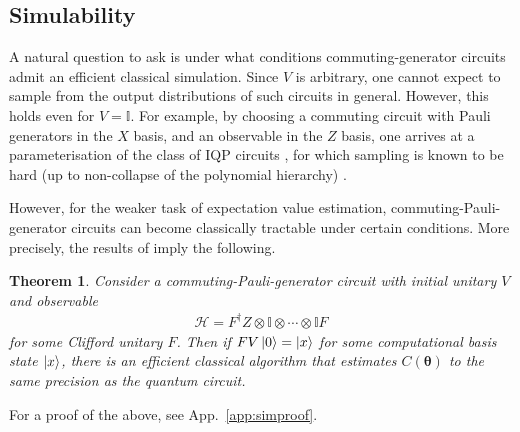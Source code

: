 \documentclass[a4paper,twocolumn,11pt]{quantumarticle}
\newtheorem{theorem}{Theorem}
\renewcommand{\vec}{\boldsymbol}
\begin{document}
\subsection{Simulability}\label{sec:simulate}
A natural question to ask is under what conditions commuting-generator circuits admit an efficient classical simulation. Since $V$ is arbitrary, one cannot expect to sample from the output distributions of such circuits in general. However, this holds even for $V=\mathbb{I}$. For example, by choosing a commuting circuit with Pauli generators in the $X$ basis, and an observable in the $Z$ basis, one arrives at a parameterisation of the class of IQP circuits \cite{bremner2016average,ni2012commuting}, for which sampling is known to be hard (up to non-collapse of the polynomial hierarchy) \cite{bremner2016average}. 

However, for the weaker task of expectation value estimation, commuting-Pauli-generator circuits can become classically tractable under certain conditions. More precisely, the results of \cite{ni2012commuting} imply the following. 

%
\begin{theorem}\label{thm:sim}
    Consider a commuting-Pauli-generator circuit with initial unitary $V$ and observable
    \begin{align}
        \mathcal{H}=F^\dagger Z \otimes \mathbb{I}\otimes\cdots\otimes\mathbb{I} F
    \end{align}
    for some Clifford unitary $F$. 
    Then if $FV\ket{0}=\ket{x}$ for some computational basis state $\ket{x}$, there is an efficient classical algorithm that estimates $C(\vec{\theta})$ to the same precision as the quantum circuit.
\end{theorem}
%
For a proof of the above, see App.\ \ref{app:simproof}. 
\end{document}
